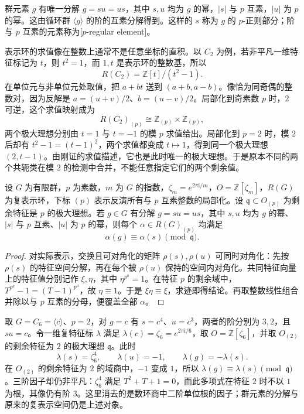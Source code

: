 群元素 \(g\) 有唯一分解 \(g=su=us\)，其中 \(s,u\) 均为 \(g\) 的幂，\(|s|\) 与 \(p\) 互素，\(|u|\) 为 \(p\) 的幂。这由循环群 \(\langle g\rangle\) 的阶的互素分解得到。这样的 \(s\) 称为 \(g\) 的 \(p\)-正则部分；阶与 \(p\) 互素的元素称为[\(p\)-regular element]。

\ProseParagraphBreak
表示环的求值像在整数上通常不是任意坐标的直积。以 \(C_2\) 为例，若非平凡一维特征标记为 \(t\)，则 \(t^2=1\)，而 \(1,t\) 是表示环的整数基，所以
\[
	R(C_2)=\mathbb Z[t]/(t^2-1).
\]
在单位元与非单位元处取值，把 \(a+bt\) 送到 \((a+b,a-b)\)。像恰为同奇偶的整数对，因为反解是 \(a=(u+v)/2\)、\(b=(u-v)/2\)。局部化到奇素数 \(p\) 时，\(2\) 可逆，这个求值映射成为
\[
	R(C_2)_{(p)}\cong\mathbb Z_{(p)}\times\mathbb Z_{(p)},
\]
两个极大理想分别由 \(t=1\) 与 \(t=-1\) 的模 \(p\) 求值给出。局部化到 \(p=2\) 时，模 \(2\) 后却有 \(t^2-1=(t-1)^2\)，两个求值都变成 \(t\mapsto1\)，得到同一个极大理想 \((2,t-1)\)。由刚证的求值描述，它也是此时唯一的极大理想。于是原本不同的两个共轭类在模 \(2\) 的检测中合并，不能任意指定它们的两个剩余值。

\begin{lemma}\label{b5:lem:character-p-regular-reduction}
	设 \(G\) 为有限群，\(p\) 为素数，\(m\) 为 \(G\) 的指数，\(\zeta_m=e^{2\pi\mathrm i/m}\)，\(O=\mathbb Z[\zeta_m]\)，\(R(G)\) 为复表示环，下标 \((p)\) 表示反演所有与 \(p\) 互素整数的局部化。设 \(\mathfrak q\subset O_{(p)}\) 为剩余特征是 \(p\) 的极大理想。若 \(g\in G\) 有分解 \(g=su=us\)，其中 \(s,u\) 均为 \(g\) 的幂、\(|s|\) 与 \(p\) 互素、\(|u|\) 为 \(p\) 的幂，则每个 \(\alpha\in R(G)_{(p)}\) 均满足
	\[
		\alpha(g)\equiv\alpha(s)\pmod{\mathfrak q}.
	\]
\end{lemma}
\begin{proof}
	对实际表示，交换且可对角化的矩阵 \(\rho(s),\rho(u)\) 可同时对角化：先按 \(\rho(s)\) 的特征空间分解，再在每个被 \(\rho(u)\) 保持的空间内对角化。共同特征向量上的特征值分别记作 \(\xi,\eta\)，其中 \(\eta^{p^a}=1\)。在特征 \(p\) 的剩余域中，\(T^{p^a}-1=(T-1)^{p^a}\)，故 \(\eta\equiv1\)。于是 \(\xi\eta\equiv\xi\)，求迹即得结论。再取整数线性组合并除以与 \(p\) 互素的分母，便覆盖全部 \(\alpha\)。
\end{proof}

取 \(G=C_6=\langle c\rangle\)、\(p=2\)，对 \(g=c\) 有 \(s=c^4\)、\(u=c^3\)，两者的阶分别为 \(3,2\)，且 \(su=c\)。令一维复特征标 \(\lambda\) 满足 \(\lambda(c)=\zeta_6=e^{2\pi\mathrm i/6}\)，取 \(O=\mathbb Z[\zeta_6]\)，并取 \(O_{(2)}\) 的剩余特征为 \(2\) 的极大理想 \(\mathfrak q\)。此时
\[
	\lambda(s)=\zeta_6^4,\qquad \lambda(u)=-1,\qquad \lambda(g)=-\lambda(s).
\]
在 \(O_{(2)}\) 的剩余特征为 \(2\) 的域商中，\(-1\) 变成 \(1\)，所以 \(\lambda(g)\equiv\lambda(s)\pmod{\mathfrak q}\)。三阶因子却仍非平凡：\(\zeta_6^4\) 满足 \(T^2+T+1=0\)，而此多项式在特征 \(2\) 时不以 \(1\) 为根，其像仍有阶 \(3\)。这里消去的是数环商中二阶单位根的因子；群元素的分解与原来的复表示空间仍是上述对象。

